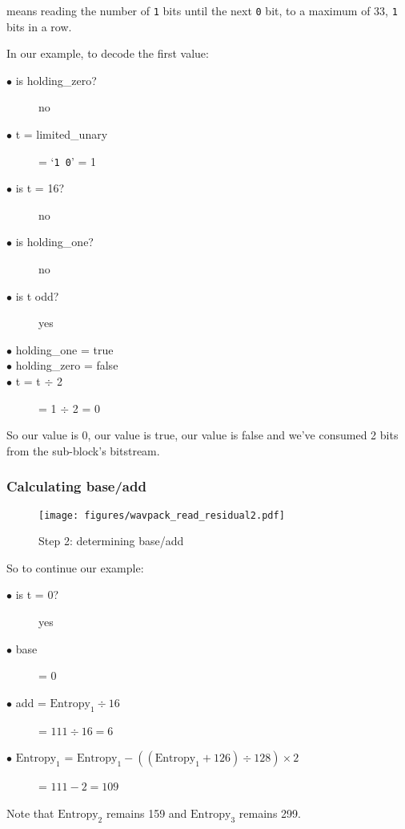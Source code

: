  means reading the number
of \texttt{1} bits until the next \texttt{0} bit, to a maximum
of 33, \texttt{1} bits in a row.

In our example, to decode the first  value:
\begin{description}
\item[$\bullet$ is holding\_zero?] no
\item[$\bullet$ t = limited\_unary] = `\texttt{1 0}' = 1
\item[$\bullet$ is t = 16?] no
\item[$\bullet$ is holding\_one?] no
\item[$\bullet$ is t odd?] yes
\item[$\bullet$ holding\_one = true]
\item[$\bullet$ holding\_zero = false]
\item[$\bullet$ t = t $\div$ 2] = 1 $\div$ 2 = 0
\end{description}
So our  value is 0, our  value is true,
our  value is false and we've
consumed 2 bits from the sub-block's bitstream.

\clearpage

\subsubsection{Calculating base/add}
\begin{figure}[h]
\texttt{[image: figures/wavpack\_read\_residual2.pdf]}
\caption{Step 2: determining base/add}
\end{figure}
\par
\noindent
So to continue our example:
\begin{description}
\item[$\bullet$ is t = 0?] yes
\item[$\bullet$ base] = 0
\item[$\bullet$ add = $\text{Entropy}_1 \div 16$] = $111 \div 16 = 6$
\item[$\bullet$ $\text{Entropy}_1$ = $\text{Entropy}_1 - ((\text{Entropy}_1 + 126) \div 128) \times 2$] = $111 - 2 = 109$
\end{description}
Note that $\text{Entropy}_2$ remains 159 and $\text{Entropy}_3$ remains 299.

\clearpage

